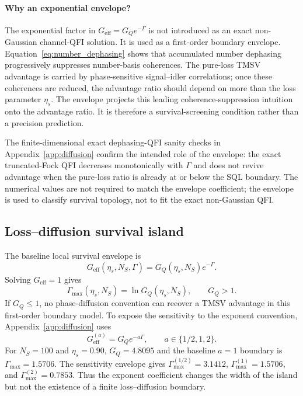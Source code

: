 \documentclass[a4paper,11pt]{article}
\numberwithin{equation}{section}
\newcommand{\Ns}{N_{S}}
\newcommand{\etas}{\eta_s}
\newcommand{\GQ}{G_Q}
\newcommand{\Geff}{G_{\mathrm{eff}}}
\begin{document}
\paragraph{Why an exponential envelope?}
The exponential factor in $\Geff=\GQ e^{-\Gamma}$ is not introduced as an exact non-Gaussian channel-QFI solution. It is used as a first-order boundary envelope. Equation~\eqref{eq:number_dephasing} shows that accumulated number dephasing progressively suppresses number-basis coherences. The pure-loss TMSV advantage is carried by phase-sensitive signal--idler correlations; once these coherences are reduced, the advantage ratio should depend on more than the loss parameter $\eta_s$. The envelope projects this leading coherence-suppression intuition onto the advantage ratio. It is therefore a survival-screening condition rather than a precision prediction.

The finite-dimensional exact dephasing-QFI sanity checks in Appendix~\ref{app:diffusion} confirm the intended role of the envelope: the exact truncated-Fock QFI decreases monotonically with $\Gamma$ and does not revive advantage when the pure-loss ratio is already at or below the SQL boundary. The numerical values are not required to match the envelope coefficient; the envelope is used to classify survival topology, not to fit the exact non-Gaussian QFI.

\subsection{Loss--diffusion survival island}

The baseline local survival envelope is
\begin{equation}
  \Geff(\etas,\Ns,\Gamma)=\GQ(\etas,\Ns)e^{-\Gamma}.
  \label{eq:geff}
\end{equation}
Solving $\Geff=1$ gives
\begin{equation}
  \Gamma_{\max}(\etas,\Ns)=\ln \GQ(\etas,\Ns),\qquad \GQ>1.
  \label{eq:gamma_max}
\end{equation}
If $\GQ\le1$, no phase-diffusion convention can recover a TMSV advantage in this first-order boundary model. To expose the sensitivity to the exponent convention, Appendix~\ref{app:diffusion} uses
\begin{equation}
  \Geff^{(a)}=\GQ e^{-a\Gamma},\qquad a\in\{1/2,1,2\}.
\end{equation}
For $\Ns=100$ and $\etas=0.90$, $\GQ=4.8095$ and the baseline $a=1$ boundary is $\Gamma_{\max}=1.5706$. The sensitivity envelope gives $\Gamma^{(1/2)}_{\max}=3.1412$, $\Gamma^{(1)}_{\max}=1.5706$, and $\Gamma^{(2)}_{\max}=0.7853$. Thus the exponent coefficient changes the width of the island but not the existence of a finite loss--diffusion boundary.
\end{document}
